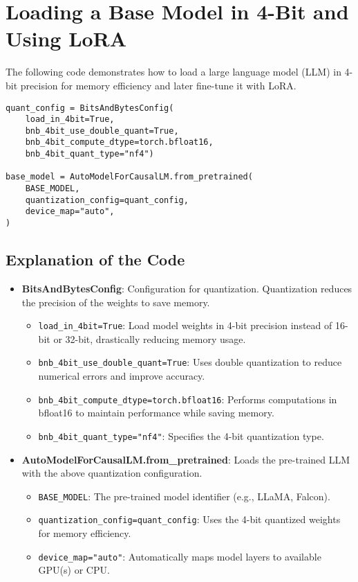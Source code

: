 \newpage
\section{Loading a Base Model in 4-Bit and Using LoRA}

The following code demonstrates how to load a large language model (LLM) in 4-bit precision for memory efficiency and later fine-tune it with LoRA.

\begin{verbatim}
quant_config = BitsAndBytesConfig(
    load_in_4bit=True,
    bnb_4bit_use_double_quant=True,
    bnb_4bit_compute_dtype=torch.bfloat16,
    bnb_4bit_quant_type="nf4")

base_model = AutoModelForCausalLM.from_pretrained(
    BASE_MODEL,
    quantization_config=quant_config,
    device_map="auto",
)
\end{verbatim}

\subsection{Explanation of the Code}

\begin{itemize}
    \item \textbf{BitsAndBytesConfig}: Configuration for quantization. Quantization reduces the precision of the weights to save memory.
    \begin{itemize}
        \item \texttt{load\_in\_4bit=True}: Load model weights in 4-bit precision instead of 16-bit or 32-bit, drastically reducing memory usage.
        \item \texttt{bnb\_4bit\_use\_double\_quant=True}: Uses double quantization to reduce numerical errors and improve accuracy.
        \item \texttt{bnb\_4bit\_compute\_dtype=torch.bfloat16}: Performs computations in bfloat16 to maintain performance while saving memory.
        \item \texttt{bnb\_4bit\_quant\_type="nf4"}: Specifies the 4-bit quantization type.
    \end{itemize}
    
    \item \textbf{AutoModelForCausalLM.from\_pretrained}: Loads the pre-trained LLM with the above quantization configuration.
    \begin{itemize}
        \item \texttt{BASE\_MODEL}: The pre-trained model identifier (e.g., LLaMA, Falcon).
        \item \texttt{quantization\_config=quant\_config}: Uses the 4-bit quantized weights for memory efficiency.
        \item \texttt{device\_map="auto"}: Automatically maps model layers to available GPU(s) or CPU.
    \end{itemize}
\end{itemize}


